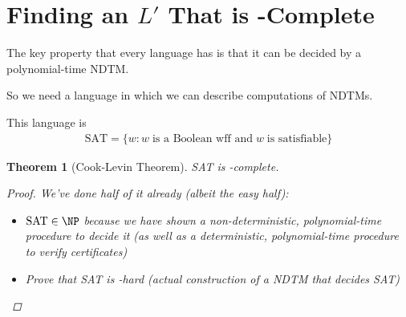\documentclass[a4paper]{report}
\newtheorem{theo}{Theorem}
\newcommand{\bookref}[3]{\marginpar{\faBook{}~#1\\Chapter #2\\Section #3}}
\theoremstyle{definition}
\begin{document}
\section{Finding an $L'$ That is \NP-Complete}
\bookref{ER}{28}{28.5.2}
The key property that every \NP{} language has is that it can be decided by a polynomial-time NDTM.

So we need a language in which we can describe computations of NDTMs.

This language is
%
\begin{align*}
\text{SAT} = \{ w : w \;\text{is a Boolean wff and}\; w\; \text{is satisfiable} \}
\end{align*}
%
\begin{theo}[Cook-Levin Theorem]
SAT is \NP-complete.
\begin{proof}
We've done half of it already (albeit the easy half):
\begin{itemize}
\item $\text{SAT} \in \NP$ because we have shown a non-deterministic, polynomial-time procedure to decide it (as well as a deterministic, polynomial-time procedure to verify certificates)
\item Prove that SAT is \NP-hard (actual construction of a NDTM that decides SAT)
\end{itemize}
\end{proof}
\end{theo}
\end{document}
